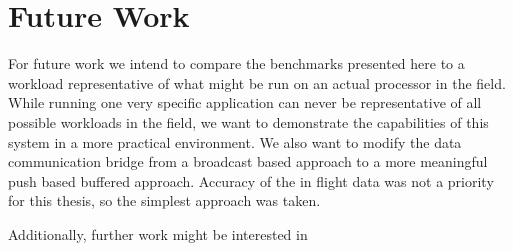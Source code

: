 \documentclass[../bachelor_paper.tex]{subfiles}
\begin{document}
\chapter{Future Work}
    \label{ch:future}
For future work we intend to compare the benchmarks presented here to a workload representative of what might be run on an actual processor in the field. While running one very specific application can never be representative of all possible workloads in the field, we want to demonstrate the capabilities of this system in a more practical environment. We also want to modify the data communication bridge from a broadcast based approach to a more meaningful push based buffered approach. Accuracy of the in flight data was not a priority for this thesis, so the simplest approach was taken. 

Additionally, further work might be interested in 


\isstandalone



\fi
\end{document}
